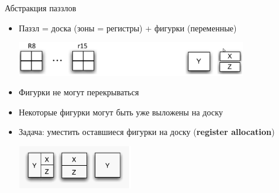 \documentclass[aspectratio=169
  , xcolor={svgnames}
  , hyperref={ colorlinks,citecolor=DeepPink4
             , linkcolor=DarkRed,urlcolor=DarkBlue}
  , russian
  ]{beamer}
\theoremstyle{exerciseStyle1}
\begin{document}
%


\begin{frame}[fragile]{Абстракция паззлов}
\begin{itemize}
\item Паззл = доска (зоны = регистры)  + фигурки (переменные)
\begin{center}
\includegraphics[width=10cm]{figures/puzzle-pieces2.png}
\end{center}
\item  Фигурки не могут перекрываться
\item  Некоторые фигурки могут быть уже выложены на доску
\item  Задача: уместить оставшиеся фигурки на доску (\textbf{register allocation})
\begin{center}
\includegraphics[width=5cm]{figures/puzzle-pieces1.png}
\end{center}
\end{itemize}
\end{frame}
\end{document}
